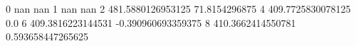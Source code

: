 0 nan nan
1 nan nan
2 481.5880126953125 71.8154296875
4 409.7725830078125 0.0
6 409.3816223144531 -0.390960693359375
8 410.3662414550781 0.593658447265625
